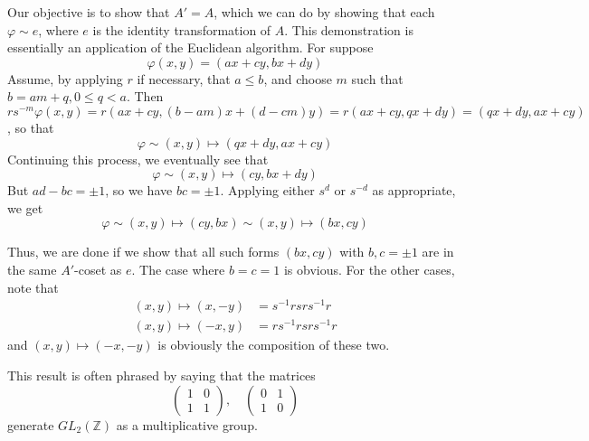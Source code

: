 \documentclass[12pt]{article}
\newcommand{\Ints}{\mathbb{Z}}
\begin{document}
Our objective is to show that $A'=A$, which we can do by showing that each $\varphi\sim e$, where $e$ is the identity transformation of $A$. This demonstration is essentially an application of the Euclidean algorithm. For suppose
\[\varphi(x,y)=(ax+cy,bx+dy)\]
Assume, by applying $r$ if necessary, that $a\leq b$, and choose $m$ such that $b=am+q, 0\leq q<a$. Then $rs^{-m}\varphi(x,y)=r(ax+cy,(b-am)x+(d-cm)y)=r(ax+cy,qx+dy)=(qx+dy,ax+cy)$, so that
\[\varphi\sim (x,y)\mapsto(qx+dy,ax+cy)\]
Continuing this process, we eventually see that
\[\varphi\sim (x,y)\mapsto(cy,bx+dy)\]
But $ad-bc=\pm 1$, so we have $bc=\pm 1$. Applying either $s^d$ or $s^{-d}$ as appropriate, we get
\[\varphi\sim (x,y)\mapsto(cy,bx)\sim(x,y)\mapsto(bx,cy)\]

Thus, we are done if we show that all such forms $(bx,cy)$ with $b,c=\pm 1$ are in the same $A'$-coset as $e$. The case where $b=c=1$ is obvious. For the other cases, note that
\begin{align*}(x,y)\mapsto(x,-y)&=s^{-1}rsrs^{-1}r\\
(x,y)\mapsto(-x,y)&=rs^{-1}rsrs^{-1}r
\end{align*}
and $(x,y)\mapsto(-x,-y)$ is obviously the composition of these two.

This result is often phrased by saying that the matrices
\[\begin{pmatrix}1&0\\1&1\end{pmatrix},\quad\begin{pmatrix}0&1\\1&0\end{pmatrix}\]
generate $GL_2(\Ints)$ as a multiplicative group.
\end{document}
